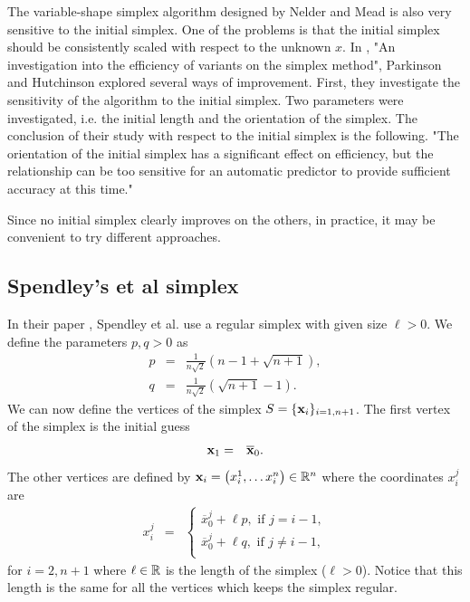 The variable-shape simplex algorithm designed by Nelder and Mead is also very
sensitive to the initial simplex.
One of the problems is that the initial simplex should be consistently scaled 
with respect to the unknown $x$.
In \cite{parkinson1972}, "An investigation into the efficiency of variants on the simplex method", 
Parkinson and Hutchinson explored 
several ways of improvement. First, they investigate the sensitivity
of the algorithm to the initial simplex. Two parameters were investigated,
i.e. the initial length and the orientation of the simplex. 
The conclusion of their study with respect to the initial simplex is 
the following. "The orientation of the initial simplex has a significant effect 
on efficiency, but the relationship can be too sensitive for an automatic 
predictor to provide sufficient accuracy at this time."

Since no initial simplex clearly improves on the others, in practice, 
it may be convenient to try different approaches.

\subsection{Spendley's et al simplex}

In their paper \cite{Spendley1962}, Spendley et al. use a regular 
simplex with given size $\ell>0$. We define the parameters $p,q>0$ as 
\begin{eqnarray}
p &=& \frac{1}{n\sqrt{2}} \left(n-1 + \sqrt{n+1}\right), \\
q &=& \frac{1}{n\sqrt{2}} \left(\sqrt{n+1} - 1\right).
\end{eqnarray}
We can now define the vertices of the simplex $S=\{\mathbf{x}_i\}_{i=1,n+1}$.
The first vertex of the simplex is the initial guess 
\begin{eqnarray}
\mathbf{x}_1 &=& \overline{\mathbf{x}}_0.
\end{eqnarray}
The other vertices are defined by $\mathbf{x}_i = \left( x_i^1, \ldots x_i^n\right)\in\mathbb{R}^n$
where the coordinates $x_i^j$ are 
\begin{eqnarray}
x_i^j &=& 
\left\{
\begin{array}{l}
\overline{x}_0^j + \ell p, \textrm{ if } j=i-1,\\
\overline{x}_0^j + \ell q, \textrm{ if } j\neq i-1,\\
\end{array}
\right.
\end{eqnarray}
for $i=2,n+1$ where $\ell \in\mathbb{R}$ is the length of the simplex ($\ell>0$). Notice that this 
length is the same for all the vertices which keeps the simplex regular.

